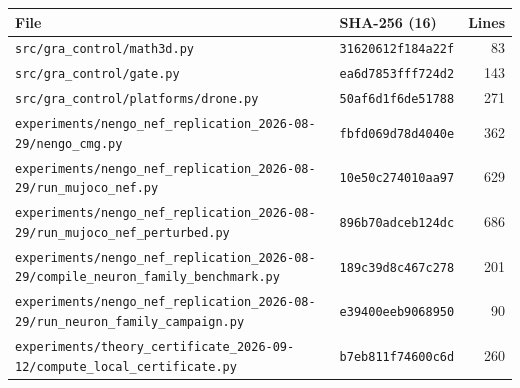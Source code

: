 \begin{tabular}{@{}ll r@{}}
\toprule
File & SHA-256 (16) & Lines\\
\midrule
\texttt{src/gra\_control/math3d.py} & \texttt{31620612f184a22f} & 83\\
\texttt{src/gra\_control/gate.py} & \texttt{ea6d7853fff724d2} & 143\\
\texttt{src/gra\_control/platforms/drone.py} & \texttt{50af6d1f6de51788} & 271\\
\texttt{experiments/nengo\_nef\_replication\_2026-08-29/nengo\_cmg.py} & \texttt{fbfd069d78d4040e} & 362\\
\texttt{experiments/nengo\_nef\_replication\_2026-08-29/run\_mujoco\_nef.py} & \texttt{10e50c274010aa97} & 629\\
\texttt{experiments/nengo\_nef\_replication\_2026-08-29/run\_mujoco\_nef\_perturbed.py} & \texttt{896b70adceb124dc} & 686\\
\texttt{experiments/nengo\_nef\_replication\_2026-08-29/compile\_neuron\_family\_benchmark.py} & \texttt{189c39d8c467c278} & 201\\
\texttt{experiments/nengo\_nef\_replication\_2026-08-29/run\_neuron\_family\_campaign.py} & \texttt{e39400eeb9068950} & 90\\
\texttt{experiments/theory\_certificate\_2026-09-12/compute\_local\_certificate.py} & \texttt{b7eb811f74600c6d} & 260\\
\bottomrule
\end{tabular}
